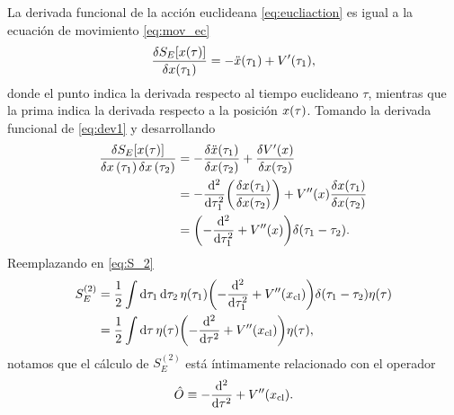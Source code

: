 La derivada funcional de la acción euclideana \eqref{eq:eucliaction} es igual a la ecuación de movimiento \eqref{eq:mov_ec}
\begin{equation} \label{eq:dev1}
	\fdv{S_E\qty[x\qty(\tau)]}{x\qty(\tau_1)} = -\ddot{x}\qty(\tau_1) + V'\qty(\tau_1),
\end{equation}
donde el punto indica la derivada respecto al tiempo euclideano $\tau$, mientras que la prima indica la derivada respecto a la posición $x\qty(\tau)$. Tomando la derivada funcional de \eqref{eq:dev1} y desarrollando 
\begin{align}
\frac{\var{S_E[x\qty(\tau)]}}{{\var{x}(\tau_1)} \var{x}\qty(\tau_2)} &= -\fdv{\ddot{x}\qty(\tau_1)}{x\qty(\tau_2)} + \fdv{V'\qty(x)}{x\qty(\tau_2)} \\
&= -\dv[2]{\tau_1}\qty(\fdv{x\qty(\tau_1)}{x\qty(\tau_2)}) + V''\qty(x)\fdv{x\qty(\tau_1)}{x\qty(\tau_2)} \\
&= \qty(-\dv[2]{\tau_1} + V''\qty(x)) \delta\qty(\tau_1 - \tau_2).
\end{align}
Reemplazando en \eqref{eq:S_2}
\begin{align}
	S_E^{(2)} &= \frac{1}{2} \int \dd{\tau_1} \dd{\tau_2} \eta\qty(\tau_1) \qty(-\dv[2]{\tau_1} + V''\qty(x_{\text{cl}}))\delta\qty(\tau_1 - \tau_2) \eta\qty(\tau) \\ \label{eq:S_2_1}
	&= \frac{1}{2} \int \dd{\tau} \eta\qty(\tau) \qty(-\dv[2]{\tau} + V''\qty(x_{\text{cl}})) \eta\qty(\tau),
\end{align}
notamos que el cálculo de $S_E^{(2)}$ está íntimamente relacionado con el operador
\begin{equation} \label{eq:operador}
	\hat{O} \equiv -\dv[2]{\tau} + V''\qty(x_{\text{cl}}).
\end{equation}

